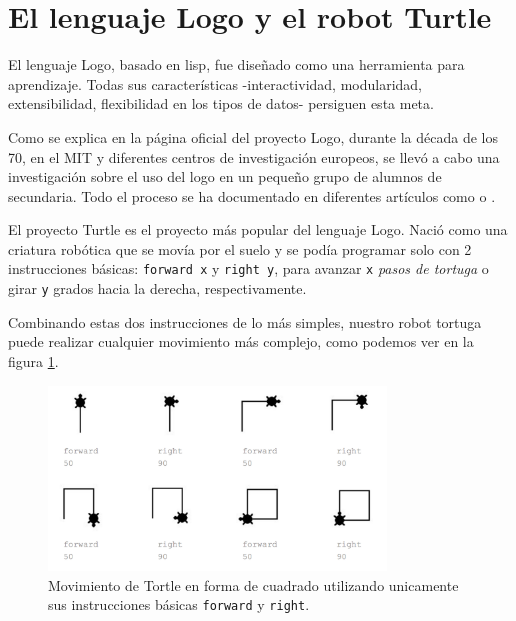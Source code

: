 \section{El lenguaje Logo y el robot Turtle}
\label{sec:Logo}

El lenguaje Logo, basado en \Gls{lisp}, fue diseñado como una herramienta para aprendizaje. Todas sus características -interactividad, modularidad, extensibilidad, flexibilidad en los tipos de datos- persiguen esta meta.


Como se explica en la página oficial del proyecto Logo\cite{logo}, durante la década de los 70, en el \acrfull{MIT} y diferentes centros de investigación europeos, se llevó a cabo una investigación sobre el uso del \Gls{logo} en un pequeño grupo de alumnos de secundaria. Todo el proceso se ha documentado en diferentes artículos como \cite{feurzeig1969programming} o \cite{pea1984logo}.


El proyecto Turtle es el proyecto más popular del lenguaje Logo. Nació como una criatura robótica que se movía por el suelo y se podía programar solo con 2 instrucciones básicas: \texttt{forward x} y \texttt{right y}, para avanzar \texttt{x} \emph{pasos de tortuga} o girar \texttt{y} grados hacia la derecha, respectivamente.

Combinando estas dos instrucciones de lo más simples, nuestro robot tortuga puede realizar cualquier movimiento más complejo, como podemos ver en la figura \ref{fig:mov-tortle}.

\begin{figure}[!ht]
	\begin{centering}
		\includegraphics[width=0.8\textwidth]{images/mov-tortle.png}
			\caption{Movimiento de Tortle en forma de cuadrado utilizando unicamente sus instrucciones básicas \texttt{forward} y \texttt{right}.}
				\label{fig:mov-tortle}
	\end{centering}
\end{figure}

